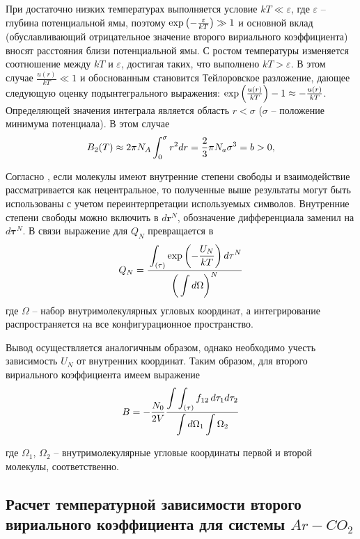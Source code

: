 При достаточно низких температурах выполняется условие $k T \ll \varepsilon$, где $\varepsilon$ -- глубина потенциальной ямы, поэтому $\exp \left( - \frac{\varepsilon}{k T} \right) \gg 1$ и основной вклад (обуславливающий отрицательное значение второго вириального коэффициента) вносят расстояния близи потенциальной ямы. С ростом температуры изменяется соотношение между $k T$ и $\varepsilon$, достигая таких, что выполнено $k T > \varepsilon$. В этом случае $\frac{u(r)}{k T} \ll 1$ и обоснованным становится Тейлоровское разложение, дающее следующую оценку подынтегрального выражения: $\exp \left( \frac{u(r)}{kT} \right) - 1 \approx - \frac{u(r)}{kT}$. Определяющей значения интеграла является область $r < \sigma$ ($\sigma$ -- положение минимума потенциала). В этом случае
\vverh
\begin{gather}
	B_2(T) \approx 2 \pi N_A \int_0^\sigma r^2 dr = \frac{2}{3} \pi N_a \sigma^3 = b > 0, \notag
\end{gather}

Согласно \cite{meyson}, если молекулы имеют внутренние степени свободы и взаимодействие рассматривается как нецентральное, то полученные выше результаты могут быть использованы с учетом переинтерпретации используемых символов. Внутренние степени свободы можно включить в $d \mathbf{r}^N$, обозначение дифференциала заменил на $d \mathbf{\tau}^N$. В связи выражение для $Q_N$ превращается в 
\vverh
\begin{gather}
	Q_N = \frac{\displaystyle \strut\int_{\left( \tau \right)} \exp \left( - \frac{U_N}{k T}\right) d \mathbf{\tau}^N}{\displaystyle \left( \strut\int d \Omega \right)^N} \notag
\end{gather}
где $\Omega$ -- набор внутримолекулярных угловых координат, а интегрирование распространяется на все конфигурационное пространство.

Вывод осуществляется аналогичным образом, однако необходимо учесть зависимость $U_N$ от внутренних координат. Таким образом, для второго вириального коэффициента имеем выражение
\vverh
\begin{gather}
	B = - \frac{N_0}{2 V} \frac{\displaystyle \int \int_{\left( \tau \right)} f_{12} \, d \tau_1 d \tau_2}{\displaystyle  \int d \Omega_1 \int \Omega_2} \label{vircoef}
\end{gather}

где $\Omega_1$, $\Omega_2$ -- внутримолекулярные угловые координаты первой и второй молекулы, соответственно.

\subsection{Расчет температурной зависимости второго вириального коэффициента для системы $Ar-CO_2$}

